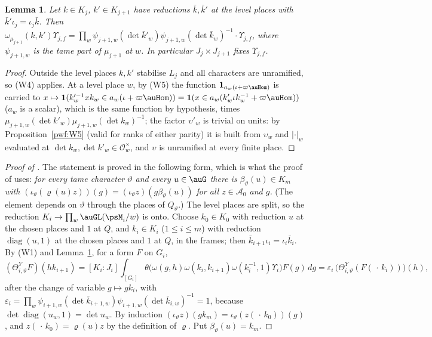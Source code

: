 \documentclass[10pt]{amsart}
\newtheorem{lemma}[theorem]{Lemma}
\theoremstyle{definition}
\theoremstyle{remark}
\providecommand{\auAz}{\mathcal A_0}
\begin{document}
\begin{lemma}\label{ps:level}
Let $k\in K_j$, $k'\in K_{j+1}$ have reductions $\bar k,\bar k'$ at the level places with
$\bar k'\iota_j=\iota_j\bar k$. Then $\omega_{\mu_{j+1}}(k,k')\Upsilon_{j,f}=\prod_w\psi_{j+1,w}
(\det\bar k'_w)\psi_{j+1,w}(\det\bar k_w)^{-1}\cdot\Upsilon_{j,f}$, where $\psi_{j+1,w}$ is the
tame part of $\mu_{j+1}$ at $w$. In particular $J_j\times J_{j+1}$ fixes $\Upsilon_{j,f}$.
\end{lemma}
\begin{proof}
Outside the level places $k,k'$ stabilise $L_j$ and all characters are unramified, so (W4)
applies. At a level place $w$, by (W5) the function $\mathbf 1_{a_w(\iota+\varpi\auHom)}$ is carried
to $x\mapsto\mathbf 1(k_w'^{-1}xk_w\in a_w(\iota+\varpi\auHom))=\mathbf 1(x\in a_w(k'_w\iota k_w^{-1}+\varpi
\auHom))$ ($a_w$ is a scalar), which is the same function by hypothesis, times $\mu_{j+1,w}(\det k'_w)\mu_{j+1,w}(\det
k_w)^{-1}$; the factor $\upsilon'_w$ is trivial on units: by Proposition~\ref{pwf:W5} (valid for ranks of either parity) it is built from $\upsilon_w$ and $|\cdot|_w$ evaluated at $\det k_w,\det k'_w\in\mathcal O_w^\times$, and $\upsilon$ is unramified at every
finite place.
\end{proof}

\begin{proof}[Proof of {\cite[Proposition~14.27]{P46}}]
The statement is proved in the following form, which is what the proof of
{\cite[Proposition~14.28]{P46}} uses: \emph{for every tame character $\vartheta$ and every $u\in\auG$
there is $\beta_\vartheta(u)\in K_m$ with $(\iota_\vartheta(\varrho(u)z))(g)=(\iota_\vartheta z)
(g\beta_\vartheta(u))$ for all $z\in\auAz$ and $g$.} (The element depends on $\vartheta$ through
the places of $Q_\vartheta$.) The level places are split, so the reduction $K_i\to\prod_w\auGL
(\psM_i/w)$ is onto. Choose $k_0\in K_0$ with reduction $u$ at the chosen places and $1$ at $Q$, and
$k_i\in K_i$ ($1\le i\le m$) with reduction $\operatorname{diag}(u,1)$ at the chosen places and $1$
at $Q$, in the frames; then $\bar k_{i+1}\iota_i=\iota_i\bar k_i$. By (W1) and
Lemma~\ref{ps:level}, for a form $F$ on $G_i$,
\[
(\Theta^Y_{i,\vartheta}F)(hk_{i+1})=[K_i:J_i]\!\int_{[G_i]}\!\theta\bigl(\omega(g,h)\omega(k_i,k_{i+1})
\omega(k_i^{-1},1)\Upsilon_i\bigr)F(g)\,dg=\varepsilon_i\,\bigl(\Theta^Y_{i,\vartheta}(F(\,\cdot\,k_i))
\bigr)(h),
\]
after the change of variable $g\mapsto gk_i$, with $\varepsilon_i=\prod_w\psi_{i+1,w}(\det\bar
k_{i+1,w})\psi_{i+1,w}(\det\bar k_{i,w})^{-1}=1$, because $\det\operatorname{diag}(u_w,1)=\det u_w$.
By induction $(\iota_\vartheta z)(gk_m)=\iota_\vartheta(z(\,\cdot\,k_0))(g)$, and
$z(\,\cdot\,k_0)=\varrho(u)z$ by the definition of $\varrho$. Put $\beta_\vartheta(u)=k_m$.
\end{proof}
\end{document}
